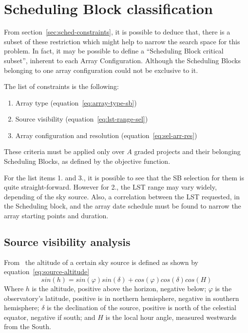 \section{Scheduling Block classification}
\label{sec:array-sb-classification}
From section~\ref{sec:sched-constraints}, it is possible to deduce that, there is a subset of these restriction which might help to narrow the search space for this problem. In fact, it may be possible to define a ``Scheduling Block critical subset'', inherent to each Array Configuration. Although the Scheduling Blocks belonging to one array configuration could not be exclusive to it.

The list of constraints is the following:
\begin{enumerate}
\item Array type (equation~\ref{eq:array-type-sb})
\item Source visibility (equation~\ref{eq:lst-range-sel})
\item Array configuration and resolution (equation~\ref{eq:sel-arr-res})
\end{enumerate}
These criteria must be applied only over $A$ graded projects and their belonging Scheduling Blocks, as defined by the objective function.

For the list items 1. and 3., it is possible to see that the SB selection for them is quite straight-forward. However for 2., the LST range may vary widely, depending of the sky source. Also, a correlation between the LST requested, in the Scheduling block, and the array date schedule must be found to narrow the array starting points and duration.

\subsection{Source visibility analysis}
From~\cite{meeus98} the altitude of a certain sky source is defined as shown by equation~\ref{eq:source-altitude}
\begin{equation}
\label{eq:source-altitude}
sin(h) = sin(\varphi) sin(\delta) + cos(\varphi) cos(\delta) cos(H)
\end{equation}
Where $h$ is the altitude, positive above the horizon, negative below; $\varphi$ is the observatory's latitude, positive is in northern hemisphere, negative in southern hemisphere; $\delta$ is the declination of the source, positive is north of the celestial equator, negative if south; and $H$ is the local hour angle, measured westwards from the South.

